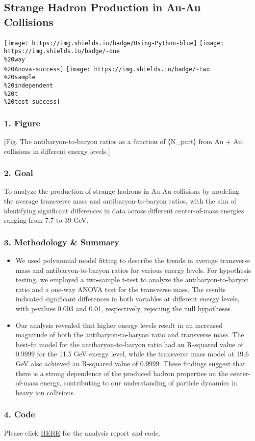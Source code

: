 \documentclass[
]{article}
\author{}
\date{\vspace{-2.5em}}
\providecommand{\tightlist}{%
  \setlength{\itemsep}{0pt}\setlength{\parskip}{0pt}}
\begin{document}
{
\setcounter{tocdepth}{5}
\tableofcontents
}

\subsection{\texorpdfstring{\textbf{Strange Hadron Production in Au-Au
Collisions}}{Strange Hadron Production in Au-Au Collisions}}\label{strange-hadron-production-in-au-au-collisions}

\texttt{[image: https://img.shields.io/badge/Using-Python-blue]}
\texttt{[image: https://img.shields.io/badge/-one\\\%20way\\\%20Anova-success]}
\texttt{[image: https://img.shields.io/badge/-two\\\%20sample\\\%20independent\\\%20t\\\%20test-success]}

\subsubsection{1. Figure}\label{figure}

{[}Fig. The antibaryon-to-baryon ratios as a function of ⟨N\_part⟩ from
Au + Au collisions in different energy levels.{]}

\subsubsection{2. Goal}\label{goal}

To analyze the production of strange hadrons in Au-Au collisions by
modeling the average transverse mass and antibaryon-to-baryon ratios,
with the aim of identifying significant differences in data across
different center-of-mass energies ranging from 7.7 to 39 GeV.

\subsubsection{3. Methodology \& Summary}\label{methodology-summary}

\begin{itemize}
\tightlist
\item
  We used polynomial model fitting to describe the trends in average
  transverse mass and antibaryon-to-baryon ratios for various energy
  levels. For hypothesis testing, we employed a two-sample t-test to
  analyze the antibaryon-to-baryon ratio and a one-way ANOVA test for
  the transverse mass. The results indicated significant differences in
  both variables at different energy levels, with p-values 0.003 and
  0.01, respectively, rejecting the null hypotheses.
\item
  Our analysis revealed that higher energy levels result in an increased
  magnitude of both the antibaryon-to-baryon ratio and transverse mass.
  The best-fit model for the antibaryon-to-baryon ratio had an R-squared
  value of 0.9999 for the 11.5 GeV energy level, while the transverse
  mass model at 19.6 GeV also achieved an R-squared value of 0.9999.
  These findings suggest that there is a strong dependence of the
  produced hadron properties on the center-of-mass energy, contributing
  to our understanding of particle dynamics in heavy ion collisions.
\end{itemize}

\subsubsection{4. Code}\label{code}

Please click \href{files/PHYS_267_Final_Project.pdf}{HERE} for the
analysis report and code.
\end{document}

